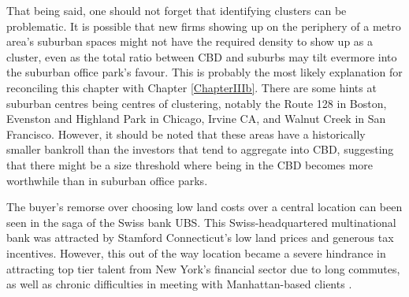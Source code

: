 That being said, one should not forget that identifying clusters can be problematic.  It is possible that new firms showing up on the periphery of a metro area's suburban spaces might not have the required density to show up as a cluster, even as the total ratio between CBD and suburbs may tilt evermore into the suburban office park's favour.  This is probably the most likely explanation for reconciling this chapter with Chapter \ref{ChapterIIIb}.  There are some hints at suburban centres being centres of clustering, notably the Route 128 in Boston, Evenston and Highland Park in Chicago, Irvine CA, and Walnut Creek in San Francisco.  However, it should be noted that these areas have a historically smaller bankroll than the investors that tend to aggregate into CBD, suggesting that there might be a size threshold where being in the CBD becomes more worthwhile than in suburban office parks.  

The buyer's remorse over choosing low land costs over a central location can been seen in the saga of the Swiss bank UBS.  This Swiss-headquartered multinational bank was attracted by Stamford Connecticut's low land prices and generous tax incentives.  However, this out of the way location became a severe hindrance in attracting top tier talent from New York's financial sector due to long commutes, as well as chronic difficulties in meeting with Manhattan-based clients \citep{NYT_2011}.    
